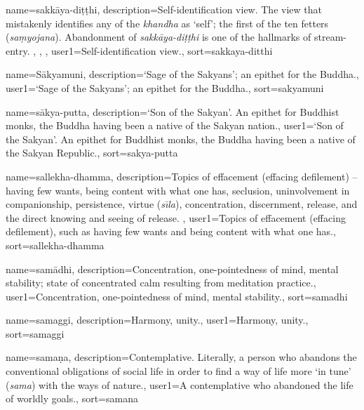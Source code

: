 {
name={sakk\=aya-di\d{t}\d{t}hi},
description={Self-identification view. The view that mistakenly identifies any of the \textit{khandha} as `self'; the first of the ten fetters (\textit{sa\d{m}yojana}). Abandonment of \textit{sakk\=aya-di\d{t}\d{t}hi} is one of the hallmarks of stream-entry. \protect \seepre %
\protect {}, \protect {}, \protect {}%
\protect \seepost %
},
user1={Self-identification view.},
sort={sakkaya-ditthi}
}

{
name={S\=akyamuni},
description={`Sage of the Sakyans'; an epithet for the Buddha.},
user1={`Sage of the Sakyans'; an epithet for the Buddha.},
sort={sakyamuni}
}

{
name={s\=akya-putta},
description={`Son of the Sakyan'. An epithet for Buddhist monks, the Buddha having been a native of the Sakyan nation.},
user1={`Son of the Sakyan'. An epithet for Buddhist monks, the Buddha having been a native of the Sakyan Republic.},
sort={sakya-putta}
}

{
name={sallekha-dhamma},
description={Topics of effacement (effacing defilement) -- having few wants, being content with what one has, seclusion, uninvolvement in companionship, persistence, virtue (\textit{s\={\i}la}), concentration, discernment, release, and the direct knowing and seeing of release. \protect \seepre %
\protect {}%
\protect \seepost %
},
user1={Topics of effacement (effacing defilement), such as having few wants and being content with what one has.},
sort={sallekha-dhamma}
}

{
name=sam\=adhi,
description={Concentration, one-pointedness of mind, mental stability; state of concentrated calm resulting from meditation practice.},
user1={Concentration, one-pointedness of mind, mental stability.},
sort={samadhi}
}

{
name=samaggi,
description={Harmony, unity.},
user1={Harmony, unity.},
sort={samaggi}
}

{
name={sama\d{n}a},
description={Contemplative. Literally, a person who abandons the conventional obligations of social life in order to find a way of life more `in tune' (\textit{sama}) with the ways of nature.},
user1={A contemplative who abandoned the life of worldly goals.},
sort={samana}
}

